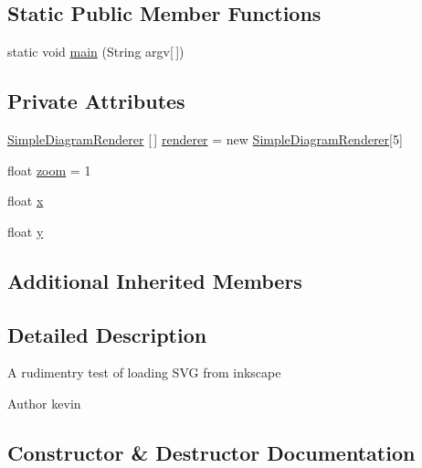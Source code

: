 \subsection*{Static Public Member Functions}
\begin{DoxyCompactItemize}
\item 
static void \mbox{\hyperlink{classorg_1_1newdawn_1_1slick_1_1tests_1_1_inkscape_test_a3a2111e00dd3ca25c44e087984e5fece}{main}} (String argv\mbox{[}$\,$\mbox{]})
\end{DoxyCompactItemize}
\subsection*{Private Attributes}
\begin{DoxyCompactItemize}
\item 
\mbox{\hyperlink{classorg_1_1newdawn_1_1slick_1_1svg_1_1_simple_diagram_renderer}{Simple\+Diagram\+Renderer}} \mbox{[}$\,$\mbox{]} \mbox{\hyperlink{classorg_1_1newdawn_1_1slick_1_1tests_1_1_inkscape_test_ad55f8a6c6ee8f9f5b708e61240e4ce9a}{renderer}} = new \mbox{\hyperlink{classorg_1_1newdawn_1_1slick_1_1svg_1_1_simple_diagram_renderer}{Simple\+Diagram\+Renderer}}\mbox{[}5\mbox{]}
\item 
float \mbox{\hyperlink{classorg_1_1newdawn_1_1slick_1_1tests_1_1_inkscape_test_ab12f97286b8d91a4a34120db6c223d73}{zoom}} = 1
\item 
float \mbox{\hyperlink{classorg_1_1newdawn_1_1slick_1_1tests_1_1_inkscape_test_ac1c5e9cb77532a2ac45acb0463eff275}{x}}
\item 
float \mbox{\hyperlink{classorg_1_1newdawn_1_1slick_1_1tests_1_1_inkscape_test_a33b17405f7d73dabfaa62122e2a042c8}{y}}
\end{DoxyCompactItemize}
\subsection*{Additional Inherited Members}


\subsection{Detailed Description}
A rudimentry test of loading S\+VG from inkscape

\begin{DoxyAuthor}{Author}
kevin 
\end{DoxyAuthor}


\subsection{Constructor \& Destructor Documentation}
\mbox{\label{classorg_1_1newdawn_1_1slick_1_1tests_1_1_inkscape_test_af8c8454a56a3690c18456a069a166a90}} 
